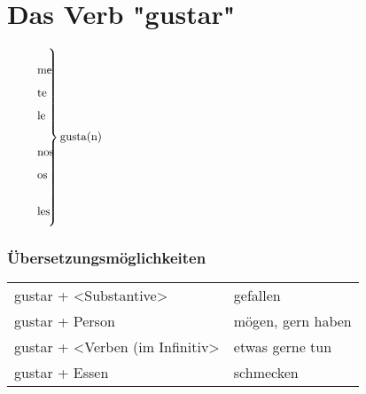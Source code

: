 \documentclass[10pt,spanish]{report}
\begin{document}
\chapter*{Das Verb "gustar"}
$
\left.\parbox{0.1\textwidth}{%
\begin{itemize}
  \item[] me
  \item[] te   
  \item[] le   
  \item[] nos   
  \item[] os  
  \item[] les   
\end{itemize}
}\right\} \vbox{\noindent gusta(n)}
$

\subsection*{Übersetzungsmöglichkeiten}
\begin{longtable}{p{}p{}} 
gustar + <Substantive> & gefallen\\
gustar + Person & mögen, gern haben\\
gustar + <Verben (im Infinitiv> & etwas gerne tun\\
gustar + Essen & schmecken
\end{longtable}
\end{document}
